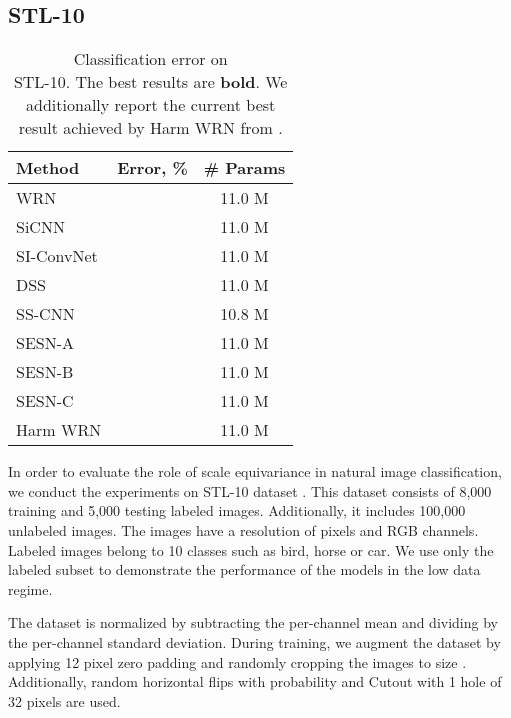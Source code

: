 \documentclass{article} \usepackage{multirow}
\begin{document}
\subsection{STL-10}

\begin{wraptable}{r}{5.5cm}
        \begin{center}
        \begin{tabular}{l|cc}
        \toprule
        Method      & Error, \%         & \# Params \\ \midrule
        WRN         &            & 11.0 M     \\
        SiCNN       &            & 11.0 M     \\
        SI-ConvNet  &            & 11.0 M     \\
DSS         &            & 11.0 M     \\
        SS-CNN      &            & 10.8 M     \\ 
        \midrule
        SESN-A        &   & 11.0 M     \\
        SESN-B        &   & 11.0 M     \\
        SESN-C        &   & 11.0 M     \\
         \midrule 
        Harm WRN &  & 11.0 M \\
        \bottomrule              
        \end{tabular}
        \end{center}
        \caption{Classification error on \\STL-10. The best results are \textbf{bold}.
        We additionally report the current best result achieved by Harm WRN from \citet{ulicny2019harmonic}.}
        \label{tab:stl10}
\end{wraptable} 


In order to evaluate the role of scale equivariance in natural image classification, we
conduct the experiments on STL-10 dataset \citet{coates2011analysis}. 
This dataset consists of 8,000 training and 5,000 testing labeled images. Additionally, it includes 100,000 unlabeled images. The images have a resolution of  pixels and RGB channels.
Labeled images belong to 10 classes such as bird, horse or car.
We use only the labeled subset to demonstrate the performance of the models in the low data regime. 

The dataset is normalized by subtracting the per-channel mean and dividing 
by the per-channel standard deviation.
During training, we augment the dataset by applying 12 pixel zero padding 
and randomly cropping the images to size . Additionally, random horizontal flips with probability  
and Cutout \citet{devries2017improved} with 1 hole of 32 pixels are used.
\end{document}
